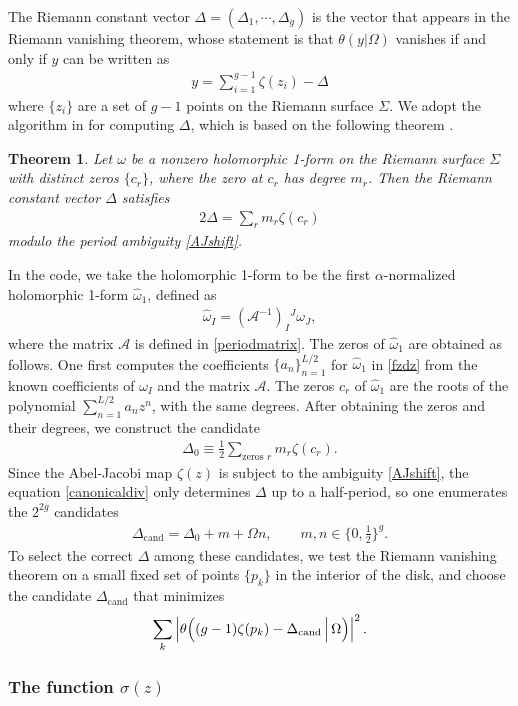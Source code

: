 \documentclass[12pt]{article}
\def\ie{\begin{equation}\begin{aligned}}
\def\fe{\end{aligned}\end{equation}}
\numberwithin{equation}{section}
\newtheorem{theorem}{Theorem}
\begin{document}
The Riemann constant vector $\Delta=(\Delta_1,\cdots, \Delta_g)$ is the vector that appears in the Riemann vanishing theorem, whose statement is that $\theta(y|\Omega)$ vanishes if and only if $y$ can be written as
\ie
y = \sum_{i=1}^{g-1} \zeta(z_i) - \Delta
\fe
where $\{z_i\}$ are a set of $g-1$ points on the Riemann surface $\Sigma$. We adopt the algorithm in \cite{deconinck2015computing} for computing $\Delta$, which is based on the following theorem \cite{farkas1980riemann}.
\begin{theorem}
Let $\omega$ be a nonzero holomorphic 1-form on the Riemann surface $\Sigma$ with distinct zeros $\{c_r\}$, where the zero at $c_r$ has degree $m_r$. Then the Riemann constant vector $\Delta$ satisfies
\ie \label{canonicaldiv}
2\Delta = \sum_r m_r \zeta(c_r)
\fe
modulo the period ambiguity \eqref{AJshift}.
\end{theorem}
In the code, we take the holomorphic 1-form to be the first $\alpha$-normalized holomorphic 1-form $\hat{\omega}_1$, defined as
\ie \label{anormalize}
\hat{\omega}_I = (\mathcal{A}^{-1})_I{}^J \omega_J,
\fe
where the matrix $\mathcal{A}$ is defined in \eqref{periodmatrix}. The zeros of $\hat{\omega}_1$ are obtained as follows. One first computes the coefficients $\{a_n\}_{n=1}^{L/2}$ for $\hat{\omega}_1$ in \eqref{fzdz} from the known coefficients of $\omega_I$ and the matrix $\mathcal{A}$. The zeros $c_r$ of $\hat{\omega}_1$ are the roots of the polynomial $\sum_{n=1}^{L/2}a_n z^n$, with the same degrees. After obtaining the zeros and their degrees, we construct the candidate
\ie
\Delta_0 \equiv \frac{1}{2}\sum_{\text{zeros }r} m_r \zeta(c_r).
\fe
Since the Abel-Jacobi map $\zeta(z)$ is subject to the ambiguity \eqref{AJshift}, the equation \eqref{canonicaldiv} only determines $\Delta$ up to a half-period, so one enumerates the $2^{2g}$ candidates
\ie
\Delta_\text{cand}=\Delta_0+m+\Omega n,\qquad m,n\in\{0,\tfrac12\}^g.
\fe
To select the correct $\Delta$ among these candidates, we test the Riemann vanishing theorem on a small fixed set of points $\{p_k\}$ in the interior of the disk, and choose the candidate $\Delta_\text{cand}$ that minimizes
\ie
\sum_k \left|\theta\Bigl((g-1)\zeta(p_k)-\Delta_{\text{cand}}\,\Big|\,\Omega\Bigr)\right|^2.
\fe

\subsubsection*{The function $\sigma(z)$}

\label{bcsection}
\end{document}
